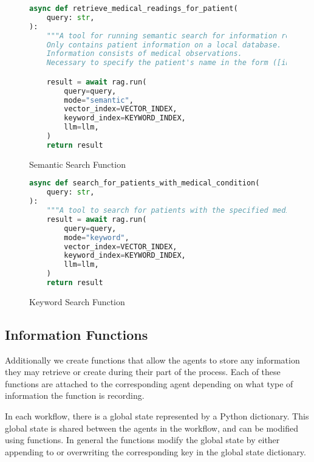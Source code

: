 \begin{figure}[h]
	\centering
	\begin{lstlisting}[language=Python, breaklines=true]
async def retrieve_medical_readings_for_patient(
    query: str,
):
    """A tool for running semantic search for information related to a patient.
    Only contains patient information on a local database.
    Information consists of medical observations.
    Necessary to specify the patient's name in the form ([information to search] for [patient name])."""

    result = await rag.run(
        query=query,
        mode="semantic",
        vector_index=VECTOR_INDEX,
        keyword_index=KEYWORD_INDEX,
        llm=llm,
    )
    return result
\end{lstlisting}
	\caption{Semantic Search Function}
	\label{fig:SemanticSearchFunc}
\end{figure}

\begin{figure}[h]
	\centering
	\small
	\begin{lstlisting}[language=Python, breaklines=true]
async def search_for_patients_with_medical_condition(
    query: str,
):
    """A tool to search for patients with the specified medical condition."""
    result = await rag.run(
        query=query,
        mode="keyword",
        vector_index=VECTOR_INDEX,
        keyword_index=KEYWORD_INDEX,
        llm=llm,
    )
    return result
\end{lstlisting}
	\caption{Keyword Search Function}
	\label{fig:KeywordSearch}
\end{figure}

\subsection{Information Functions}

Additionally we create functions that allow the agents to store any information they may retrieve or create during their part of the process. Each of these functions are attached to the corresponding agent depending on what type of information the function is recording.

In each workflow, there is a global state represented by a Python dictionary.
This global state is shared between the agents in the workflow, and can be modified using functions. In general the functions modify the global state by either appending to or overwriting the corresponding key in the global state dictionary.

